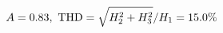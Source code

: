 \documentclass[preview]{standalone}
\begin{document}
\begin{align*}
\special{dvisvgm:raw <g id='unique000'>}A=0.83,\ \text{THD}=\sqrt{H_2^2+H_3^2}/H_1=15.0\%\special{dvisvgm:raw </g>}
\end{align*}
\end{document}

